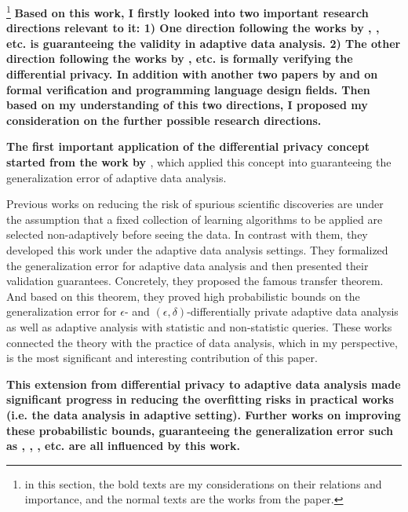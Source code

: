 \documentclass{article}
\begin{document}
\footnote{in this section, the bold texts are my considerations on their relations and importance, and the normal texts are the works from the paper.}
\textbf{Based on this work, I firstly looked into two important research directions relevant to it: 1) One direction following the works by \cite{dwork2015preserving}, \cite{smith2017information}, \cite{jung2019new} etc. is guaranteeing the validity in adaptive data analysis.
2) The other direction following the works by \cite{barthe2016proving}, \cite{near2019duet} etc. is formally verifying the differential privacy.
In addition with another two papers by \cite{ye2017verified} and \cite{xi1999dependent} on formal verification and programming language design fields.
Then based on my understanding of this two directions, I proposed my consideration on the further possible research directions.}

\textbf{The first important application of the differential privacy concept started from the work by \cite{dwork2015preserving}}, which applied this concept into guaranteeing the generalization error of adaptive data analysis. 

Previous works on reducing the risk of spurious scientific discoveries are under the assumption that a fixed collection of learning algorithms to be applied are selected non-adaptively before seeing the data. In contrast with them, they developed this work under the adaptive data analysis settings. They formalized the generalization error for adaptive data analysis and then presented their validation guarantees.
Concretely, they proposed the famous transfer theorem.
And based on this theorem, they proved high probabilistic bounds on the generalization error for $\epsilon$- and $(\epsilon,\delta)$-differentially private adaptive data analysis as well as adaptive analysis with statistic and non-statistic queries.
These works connected the theory with the practice of data analysis, which in my perspective, is the most significant and interesting contribution of this paper. 


\textbf{This extension from differential privacy to adaptive data analysis made significant progress in reducing the overfitting risks in practical works (i.e. the data analysis in adaptive setting). Further works on improving these probabilistic bounds, guaranteeing the generalization error such as \cite{dwork2015generalization}, \cite{bassily2016algorithmic}, \cite{dwork2015reusable}, \cite{jung2019new} etc. are all influenced by this work.}
\end{document}
